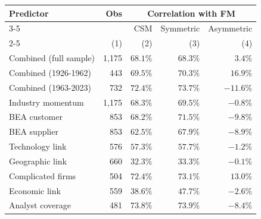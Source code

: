 \begin{tabular}{lrrrr}
  \toprule \multirow{2}{*}{Predictor} & \multirow{2}{*}{Obs} & \multicolumn{3}{c}{Correlation with FM} \\
 \cmidrule(l){3-5} & & CSM & Symmetric & Asymmetric \\
 \cmidrule(l){2-5} \vspace{5pt}  & (1) & (2) & (3) & (4) \\ 
  Combined (full sample) & 1,175 & $68.1\%$ & $68.3\%$ & $3.4\%$ \\ 
  Combined (1926-1962) & 443 & $69.5\%$ & $70.3\%$ & $16.9\%$ \\ 
   \vspace{5pt}Combined (1963-2023) & 732 & $72.4\%$ & $73.7\%$ & $-11.6\%$ \\ 
  Industry momentum & 1,175 & $68.3\%$ & $69.5\%$ & $-0.8\%$ \\ 
  BEA customer & 853 & $68.2\%$ & $71.5\%$ & $-9.8\%$ \\ 
  BEA supplier & 853 & $62.5\%$ & $67.9\%$ & $-8.9\%$ \\ 
  Technology link & 576 & $57.3\%$ & $57.7\%$ & $-1.2\%$ \\ 
  Geographic link & 660 & $32.3\%$ & $33.3\%$ & $-0.1\%$ \\ 
  Complicated firms & 504 & $72.4\%$ & $73.1\%$ & $13.0\%$ \\ 
  Economic link & 559 & $38.6\%$ & $47.7\%$ & $-2.6\%$ \\ 
  Analyst coverage & 481 & $73.8\%$ & $73.9\%$ & $-8.4\%$ \\ 
   \bottomrule\end{tabular}
